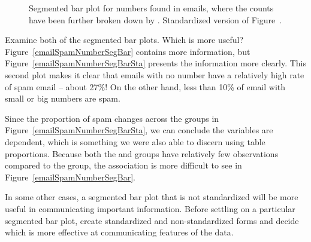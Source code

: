 \begin{figure}
\centering
{}
\caption{ Segmented bar plot for numbers found in emails, where the counts have been further broken down by .  Standardized version of Figure~.}
\label{emailSpamNumberSegBarPlot}
\end{figure}

\begin{example}{Examine both of the segmented bar plots. Which is more useful?}
Figure~\ref{emailSpamNumberSegBar} contains more information, but Figure~\ref{emailSpamNumberSegBarSta} presents the information more clearly. This second plot makes it clear that emails with no number have a relatively high rate of spam email -- about 27\%! On the other hand, less than 10\% of email with small or big numbers are spam.
\end{example}

Since the proportion of spam changes across the groups in Figure~\ref{emailSpamNumberSegBarSta}, we can conclude the variables are dependent, which is something we were also able to discern using table proportions. Because both the  and  groups have relatively few observations compared to the  group, the association is more difficult to see in Figure~\ref{emailSpamNumberSegBar}.

In some other cases, a segmented bar plot that is not standardized will be more useful in communicating important information. Before settling on a particular segmented bar plot, create standardized and non-standardized forms and decide which is more effective at communicating features of the data.


